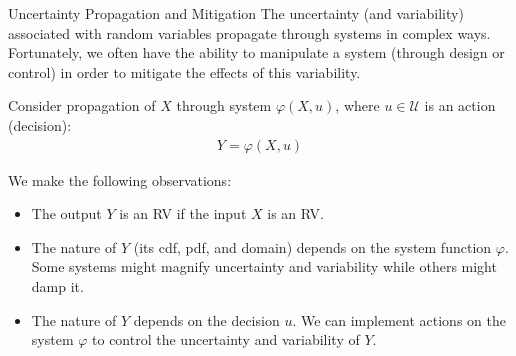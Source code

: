 \documentclass[9pt]{beamer}
\begin{document}
%
\begin{frame}{Uncertainty Propagation and Mitigation}
The uncertainty (and variability) associated with random variables propagate through systems in complex ways. Fortunately, we often have the ability to manipulate a system (through design or control) in order to mitigate the effects of this variability. 
\begin{block}{}
Consider propagation of $X$ through system $\varphi(X,u)$, where $u\in \mathcal{U}$ is an action (decision):
\begin{align*}
Y=\varphi(X,u)
\end{align*}
\end{block}
We make the following observations:
\begin{block}{}
\begin{itemize}
 \setlength{\itemsep}{5pt}
\item The output $Y$ is an RV if the input $X$ is an RV.
\item The nature of $Y$ (its cdf, pdf, and domain) depends on the system function $\varphi$. Some systems might magnify uncertainty and variability while others might damp it. 
\item The nature of $Y$ depends on the decision $u$.  We can implement actions on the system $\varphi$ to control the uncertainty and variability of $Y$.  
\end{itemize}
\end{block}
\end{frame}
\end{document}
